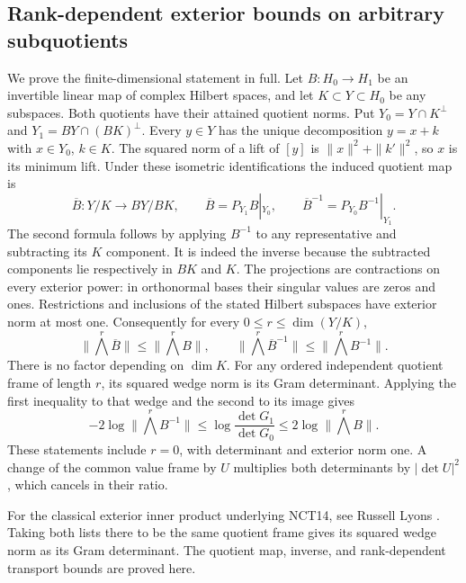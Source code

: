 \documentclass[11pt,a4paper]{article}
\begin{document}
\subsection{Rank-dependent exterior bounds on arbitrary subquotients}

We prove the finite-dimensional statement in full.  Let
\(B:H_0\to H_1\) be an invertible linear map of complex Hilbert
spaces, and let \(K\subset Y\subset H_0\) be any subspaces.
Both quotients have their attained quotient norms.  Put
\(Y_0=Y\cap K^\perp\) and
\(Y_1=BY\cap(BK)^\perp\).  Every \(y\in Y\) has the unique
decomposition \(y=x+k\) with \(x\in Y_0\), \(k\in K\).
The squared norm of a lift of \([y]\) is
\(\|x\|^2+\|k'\|^2\), so \(x\) is its minimum lift.
Under these isometric identifications the induced quotient map is
\[
 \overline B:Y/K\longrightarrow BY/BK,
 \qquad \overline B=P_{Y_1}B|_{Y_0},\qquad
 \overline B^{-1}=P_{Y_0}B^{-1}|_{Y_1}.
 \tag{NCT12}
\]
The second formula follows by applying \(B^{-1}\) to any
representative and subtracting its \(K\) component.  It is indeed
the inverse because the subtracted components lie respectively in
\(BK\) and \(K\).  The projections are contractions on every
exterior power: in orthonormal bases their singular values are
zeros and ones.  Restrictions and inclusions of the stated Hilbert
subspaces have exterior norm at most one.  Consequently for every
\(0\le r\le\dim(Y/K)\),
\[
 \|\textstyle\bigwedge^r\overline B\|
       \le\|\textstyle\bigwedge^r B\|,
 \qquad
 \|\textstyle\bigwedge^r\overline B^{-1}\|
       \le\|\textstyle\bigwedge^r B^{-1}\|.
 \tag{NCT13}
\]
There is no factor depending on \(\dim K\).  For any ordered
independent quotient frame of length \(r\), its squared wedge norm
is its Gram determinant.  Applying the first inequality to that
wedge and the second to its image gives
\[
 -2\log\|\textstyle\bigwedge^r B^{-1}\|
 \le\log\frac{\det G_1}{\det G_0}
 \le2\log\|\textstyle\bigwedge^r B\|.
 \tag{NCT14}
\]
These statements include \(r=0\), with determinant and exterior
norm one.  A change of the common value frame by \(U\) multiplies
both determinants by \(|\det U|^2\), which cancels in their ratio.

For the classical exterior inner product underlying NCT14, see
Russell Lyons \cite[\S4, (4.1), p.~11 of the cited arXiv version]{human:lyons2003}.
Taking both lists there to be the same quotient frame gives its
squared wedge norm as its Gram determinant. The quotient map,
inverse, and rank-dependent transport bounds are proved here.
\end{document}

